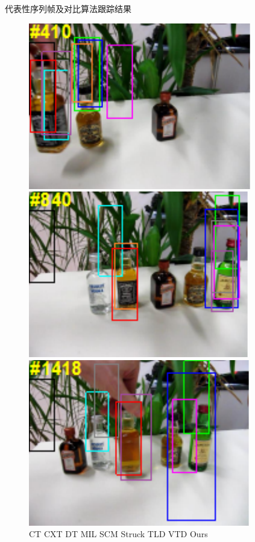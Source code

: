 \begin{frame}{代表性序列帧及对比算法跟踪结果}
\begin{figure}[htp]
\includegraphics[width=0.31\textheight,height=0.25\textheight]{figures/Figure2e1.pdf}
\includegraphics[width=0.31\textheight,height=0.25\textheight]{figures/Figure2e2.pdf}
\includegraphics[width=0.31\textheight,height=0.25\textheight]{figures/Figure2e3.pdf}\\

   CT
   CXT
   DT
   MIL
   SCM
   Struck
   TLD
   VTD
   Ours

\end{figure}

\end{frame}



